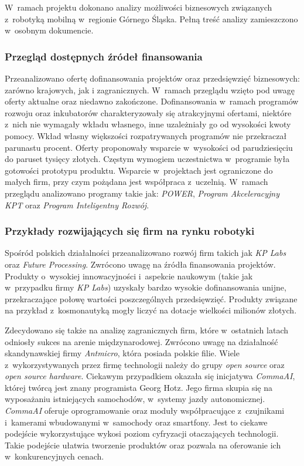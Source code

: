 W~ramach projektu dokonano analizy możliwości biznesowych związanych z~robotyką
mobilną w~regionie Górnego Śląska.
Pełną treść analizy zamieszczono w~osobnym dokumencie.

\subsubsection{Przegląd dostępnych źródeł finansowania}
Przeanalizowano ofertę dofinansowania projektów oraz przedsięwzięć biznesowych:
zarówno krajowych, jak i zagranicznych.
W~ramach przeglądu wzięto pod uwagę oferty aktualne oraz niedawno zakończone.
Dofinansowania w~ramach programów rozwoju oraz inkubatorów charakteryzowały się
atrakcyjnymi ofertami, niektóre z~nich nie wymagały wkładu własnego, inne
uzależniały go od wysokości kwoty pomocy.
Wkład własny większości rozpatrywanych programów nie przekraczał parunastu
procent.
Oferty proponowały wsparcie w~wysokości od parudziesięciu do paruset tysięcy
złotych.
Częstym wymogiem uczestnictwa w~programie była gotowości prototypu produktu.
Wsparcie w~projektach jest ograniczone do małych firm, przy czym pożądana jest
współpraca z~uczelnią.
W~ramach przeglądu analizowano programy takie jak: \textit{POWER},
\textit{Program Akceleracyjny KPT} oraz \textit{Program Inteligentny Rozwój}.

\subsubsection{Przykłady rozwijających się firm na rynku robotyki}
Spośród polskich działalności przeanalizowano rozwój firm takich jak
\textit{KP Labs} oraz \textit{Future Processing}.
Zwrócono uwagę na źródła finansowania projektów.
Produkty o~wysokiej innowacyjności i~aspekcie naukowym (takie jak w~przypadku
firmy \textit{KP Labs}) uzyskały bardzo wysokie dofinansowania unijne,
przekraczające połowę wartości poszczególnych przedsięwzięć.
Produkty związane na przykład z~kosmonautyką mogły liczyć na dotacje wielkości
milionów złotych.

Zdecydowano się także na analizę zagranicznych firm, które w~ostatnich latach
odniosły sukces na arenie międzynarodowej.
Zwrócono uwagę na działalność skandynawskiej firmy \textit{Antmicro}, która
posiada polskie filie.
Wiele z~wykorzystywanych przez firmę technologii należy do grupy \textit{open
source} oraz \textit{open source hardware}.
Ciekawym przypadkiem okazała się inicjatywa \textit{CommaAI}, której twórcą
jest znany programista Georg Hotz.
Jego firma skupia się na wyposażaniu istniejących samochodów, w~systemy jazdy
autonomicznej.
\textit{CommaAI} oferuje oprogramowanie oraz moduły współpracujące z~czujnikami
i~kamerami wbudowanymi w~samochody oraz smartfony.
Jest to ciekawe podejście wykorzystujące wykosi poziom cyfryzacji otaczających
technologii.
Takie podejście ułatwia tworzenie produktów oraz pozwala na oferowanie ich
w~konkurencyjnych cenach.

